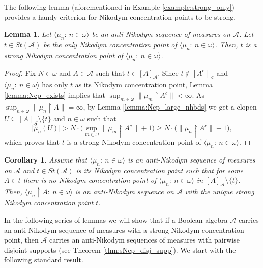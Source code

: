 \documentclass[a4paper,11pt,fleqn]{amsart}
\newtheorem{lemma}[theorem]{Lemma}
\newtheorem{corollary}[theorem]{Corollary}
\theoremstyle{definition}
\theoremstyle{remark}
\numberwithin{equation}{section}
\newcommand{\N}{\mathbb{N}}
\newcommand{\aA}{\mathcal{A}}
\newcommand{\rstr}{\restriction}
\newcommand{\sm}{\setminus}
\newcommand{\sub}{\subseteq}
\newcommand{\wh}{\widehat}
\newcommand{\seqn}[1]{\big\langle#1\colon\ n\io\big\rangle}
\newcommand{\clopen}[1]{\left[#1\right]}
\newcommand{\io}{\in\omega}%
\begin{document}
The following lemma (aforementioned in Example \ref{example:strong_only}) provides a handy criterion for Nikodym concentration points to be strong.

\begin{lemma}\label{lemma:one_Ncp_sNcp}
    Let $\seqn{\mu_n}$ be an anti-Nikodym sequence of measures on $\aA$. Let $t\in St(\aA)$ be the only Nikodym concentration point of $\seqn{\mu_n}$. Then, $t$ is a strong Nikodym concentration point of $\seqn{\mu_n}$.
%
\end{lemma}
\begin{proof}
    Fix $N\io$ and $A\in\aA$ such that $t\in\clopen{A}_\aA$. Since $t\not\in\clopen{A^c}_\aA$ and $\seqn{\mu_n}$ has only $t$ as its Nikodym concentration point, Lemma \ref{lemma:Ncp_exists} implies that $\sup_{m\io}\big\|\mu_m\rstr A^c\big\|<\infty$. As $\sup_{n\io}\big\|\mu_n\rstr A\big\|=\infty$, by Lemma \ref{lemma:Ncp_large_nhbds} we get a clopen $U\sub\clopen{A}_\aA\setminus\{t\}$ and $n\io$ such that
    \[\big|\wh{\mu}_n(U)\big|>N\cdot\Big(\sup_{m\io}\big\|\mu_m\rstr A^c\big\|+1\Big)\ge N\cdot\Big(\big\|\mu_n\rstr A^c\big\|+1\Big),\]
    which proves that $t$ is a strong Nikodym concentration point of $\seqn{\mu_n}$.
%
\end{proof}

\begin{corollary}\label{cor:finitely_many_Ncp}
Assume that $\seqn{\mu_n}$ is an anti-Nikodym sequence of measures on $\aA$ and $t\in St(\aA)$ is its Nikodym concentration point such that for some $A\in t$ there is no Nikodym concentration point of $\seqn{\mu_n}$ in $\clopen{A}_\aA\sm\{t\}$. Then, $\seqn{\mu_n\rstr A}$ is an anti-Nikodym sequence on $\aA$ with the unique strong Nikodym concentration point $t$.
\end{corollary}

In the following series of lemmas we will show that if a Boolean algebra $\aA$ carries an anti-Nikodym sequence of measures with a strong Nikodym concentration point, then $\aA$ carries an anti-Nikodym sequences of measures with pairwise disjoint supports (see Theorem \ref{thm:sNcp_disj_supp}). We start with the following standard result.
\end{document}
